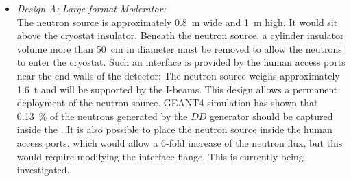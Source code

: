 \begin{itemize}
\item {\it Design A: Large format Moderator:} \\
The neutron source is approximately \SI{0.8}{\m} wide and \SI{1}{\m} high. It would sit above the cryostat insulator. Beneath the neutron source, a cylinder insulator volume more than \SI{50}{\cm} in diameter must be removed to allow the neutrons to enter the cryostat. Such an interface is provided by the human access ports near the end-walls of the detector; %
The neutron source weighs approximately \SI{1.6}{\tonne} and will be supported by the I-beams. This design allows a permanent deployment of the neutron source. GEANT4 simulation has shown that \SI{0.13}{\%} of the neutrons generated by the $DD$ generator should be captured inside the . It is also possible to place the neutron source inside the human access ports, which would allow a \num{6}-fold increase of the neutron flux, but this would require modifying the interface flange. This is currently being investigated.


\end{itemize}
